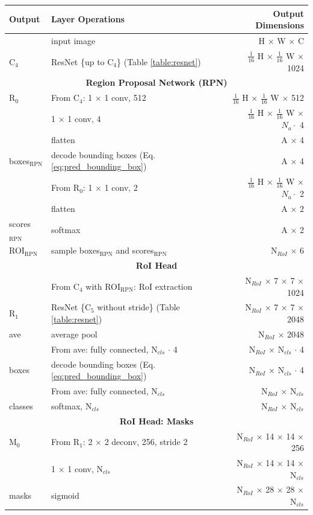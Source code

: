 {
\begin{table}[t]
\centering
\begin{tabular}{llr}
\toprule
\textbf{Output} & \textbf{Layer Operations} & \textbf{Output Dimensions} \\
\midrule\midrule
& input image & H $\times$ W $\times$ C \\
\midrule
C$_4$ & ResNet \{up to C$_4$\} (Table \ref{table:resnet})  & $\tfrac{1}{16}$ H $\times$ $\tfrac{1}{16}$ W $\times$ 1024 \\
\midrule
\multicolumn{3}{c}{\textbf{Region Proposal Network (RPN)}}\\
\midrule
R$_0$ & From C$_4$: 1 $\times$ 1 conv, 512 & $\tfrac{1}{16}$ H $\times$ $\tfrac{1}{16}$ W $\times$ 512 \\
& 1 $\times$ 1 conv, 4 & $\tfrac{1}{16}$ H $\times$ $\tfrac{1}{16}$ W $\times$ $N_a \cdot$ 4 \\
& flatten & A $\times$ 4 \\
boxes$_{\mathrm{RPN}}$ & decode bounding boxes (Eq. \ref{eq:pred_bounding_box}) & A $\times$ 4\\
& From R$_0$: 1 $\times$ 1 conv, 2 & $\tfrac{1}{16}$ H $\times$ $\tfrac{1}{16}$ W $\times$ $N_a \cdot$ 2 \\
& flatten & A $\times$ 2 \\
scores$_{\mathrm{RPN}}$& softmax & A $\times$ 2 \\
ROI$_{\mathrm{RPN}}$ & sample boxes$_{\mathrm{RPN}}$ and scores$_{\mathrm{RPN}}$ & N$_{RoI}$ $\times$ 6 \\
\midrule
\multicolumn{3}{c}{\textbf{RoI Head}}\\
\midrule
& From C$_4$ with ROI$_{\mathrm{RPN}}$: RoI extraction & N$_{RoI}$ $\times$ 7 $\times$ 7 $\times$ 1024 \\
R$_1$& ResNet \{C$_5$ without stride\} (Table \ref{table:resnet})  & N$_{RoI}$ $\times$ 7 $\times$ 7 $\times$ 2048 \\
ave & average pool & N$_{RoI}$ $\times$ 2048 \\
& From ave: fully connected, N$_{cls}$ $\cdot$ 4 & N$_{RoI}$ $\times$ N$_{cls}$ $\cdot$ 4\\
boxes & decode bounding boxes (Eq. \ref{eq:pred_bounding_box}) & N$_{RoI}$ $\times$ N$_{cls}$ $\cdot$ 4\\
& From ave: fully connected, N$_{cls}$ & N$_{RoI}$ $\times$ N$_{cls}$ \\
classes& softmax, N$_{cls}$ & N$_{RoI}$ $\times$ N$_{cls}$ \\
\midrule
\multicolumn{3}{c}{\textbf{RoI Head: Masks}}\\
\midrule
M$_0$ & From R$_1$: 2 $\times$ 2 deconv, 256, stride 2 & N$_{RoI}$ $\times$ 14 $\times$ 14 $\times$ 256 \\
& 1 $\times$ 1 conv, N$_{cls}$ & N$_{RoI}$ $\times$ 14 $\times$ 14 $\times$ N$_{cls}$ \\
masks & sigmoid & N$_{RoI}$ $\times$ 28 $\times$ 28 $\times$ N$_{cls}$ \\


\end{tabular}
\end{table}}
